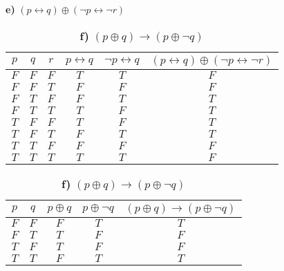 \documentclass[10pt]{ctexart}
\begin{document}
    \begin{table}[h]
        \begin{subtable}[h]{3.3in}
            \setlength{\abovecaptionskip}{0pt}
            \setlength{\belowcaptionskip}{0pt}
            \centering
            \caption*{\textbf{e)} $(p \leftrightarrow q) \oplus (\neg p \leftrightarrow \neg r)$}
            \begin{tabular}{|c|c|c|c|c|c|}
                \hline
                $p$ & $q$ & $r$ & $p \leftrightarrow q$ & $\neg p \leftrightarrow q$ & $(p \leftrightarrow q) \oplus (\neg p \leftrightarrow \neg r)$\\
                \hline
                $F$ & $F$ & $F$ & $T$ & $T$ & $F$ \\ 
                \hline
                $F$ & $F$ & $T$ & $F$ & $F$ & $F$ \\ 
                \hline
                $F$ & $T$ & $F$ & $F$ & $T$ & $T$ \\ 
                \hline
                $F$ & $T$ & $T$ & $T$ & $F$ & $T$ \\ 
                \hline
                $T$ & $F$ & $F$ & $T$ & $F$ & $T$ \\ 
                \hline
                $T$ & $F$ & $T$ & $F$ & $T$ & $T$ \\ 
                \hline
                $T$ & $T$ & $F$ & $F$ & $F$ & $F$ \\ 
                \hline
                $T$ & $T$ & $T$ & $T$ & $T$ & $F$ \\ 
                \hline
            \end{tabular}
        \end{subtable}
        \begin{subtable}[h]{4in}
            \setlength{\abovecaptionskip}{0pt}
            \setlength{\belowcaptionskip}{0pt}
            \centering
            \caption*{\textbf{f)} $(p \oplus q) \rightarrow (p \oplus \neg q)$}
            \begin{tabular}{|c|c|c|c|c|}
                \hline
                $p$ & $q$ & $p \oplus q$ & $p \oplus \neg q$ & $(p \oplus q) \rightarrow (p \oplus \neg q)$\\
                \hline
                $F$ & $F$ & $F$ & $T$ & $T$ \\ 
                \hline
                $F$ & $T$ & $T$ & $F$ & $F$ \\ 
                \hline
                $T$ & $F$ & $T$ & $F$ & $F$ \\ 
                \hline
                $T$ & $T$ & $F$ & $T$ & $T$ \\ 
                \hline
            \end{tabular}
        \end{subtable}
    \end{table}
\end{document}
